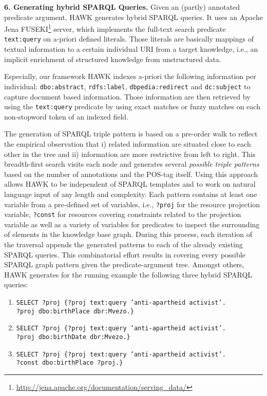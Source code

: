 \textbf{6. Generating hybrid SPARQL Queries.}
Given an (partly) annotated predicate argument, HAWK generates hybrid SPARQL queries.
It uses an Apache Jena FUSEKI\footnote{\url{http://jena.apache.org/documentation/serving_data/}} server, which implements the full-text search predicate \texttt{text:query} on a-priori defined literals. 
Those literals are basically mappings of textual information to a certain individual URI from a target knowledge, i.e., an implicit enrichment of structured knowledge from unstructured data. 

Especially, our framework HAWK indexes a-priori the following information per individual: \texttt{dbo:abstract}, \texttt{rdfs:label}, \texttt{dbpedia:redirect} and \texttt{dc:subject} to capture document based information.
Those information are then retrieved by using the \texttt{text:query} predicate by using exact matches or fuzzy matches on each non-stopword token of an indexed field.

The generation of SPARQL triple pattern is based on a pre-order walk to reflect the empirical observation that i) related information are situated close to each other in the tree and ii) information are more restrictive from left to right.
This breadth-first search visits each node and generates several \emph{possible triple patterns} based on the number of annotations and the POS-tag itself. 
Using this approach allows HAWK to be independent of SPARQL templates and to work on natural language input of any length and complexity.
Each pattern contains at least one variable from a pre-defined set of variables, i.e., \texttt{?proj} for the resource projection variable, \texttt{?const} for resources covering 
constraints related to the projection variable as well as a variety of variables for predicates to inspect the surrounding of elements in the knowledge base graph. 
During this process, each iteration of the traversal appends the generated patterns to each of the already existing SPARQL queries. 
This combinatorial effort results in covering every possible SPARQL graph pattern given the predicate-argument tree.
Amongst others, HAWK generates for the running example the following three hybrid SPARQL queries:
\begin{enumerate}
\item \texttt{SELECT ?proj  \{?proj text:query 'anti-apartheid activist'.\\ ?proj dbo:birthPlace dbr:Mvezo.\}}
\item \texttt{SELECT ?proj  \{?proj text:query 'anti-apartheid activist'.\\ ?proj dbo:birthDate dbr:Mvezo.\}}
\item \texttt{SELECT ?proj  \{?proj text:query 'anti-apartheid activist'.\\ ?const dbo:birthPlace ?proj.\}}
\end{enumerate}

